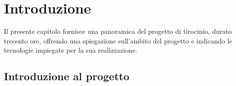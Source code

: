 \chapter{Introduzione}

Il presente capitolo fornisce una panoramica del progetto di tirocinio, durato trecento ore, offrendo una spiegazione sull'ambito del progetto e indicando le tecnologie impiegate per la sua realizzazione.

\section{Introduzione al progetto}

